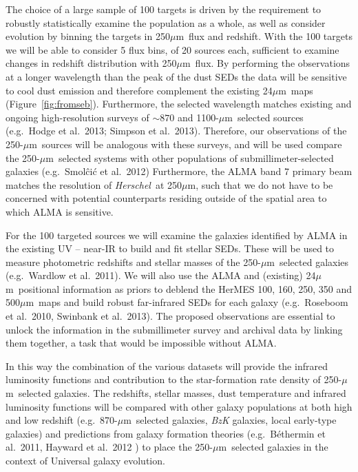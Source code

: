\documentclass[11pt,a4paper]{article}
\newcommand{\herschel}{{\it Herschel}}
\newcommand{\micron}{$\mu$m}
\begin{document}
The choice of a large sample of 100 targets is driven by the
requirement to robustly statistically examine the population as a
whole, as well as consider evolution by binning the targets in
250\micron\ flux and redshift. With the  100 targets we
will be able to consider 5 flux bins, of 20 sources each, sufficient
to examine changes in redshift distribution with 250\micron\ flux.
%
By performing the observations at a longer wavelength
than the peak of the dust SEDs the data will be sensitive to cool dust
emission and therefore complement the existing 24\micron\ maps
(Figure~\ref{fig:fromseb}). Furthermore, the selected wavelength
matches existing and ongoing high-resolution surveys of $\sim870$ and
1100-\micron\ selected sources (e.g.\ Hodge et al.\ 2013; Simpson et
al.\ 2013). Therefore, our observations of the 250-\micron\ sources
will be analogous with these surveys, and will be used compare the
250-\micron\ selected systems with other populations of
submillimeter-selected galaxies (e.g.\ Smol\^ci\'c et al.\ 2012)
Furthermore, the ALMA band 7 primary beam matches the resolution of
\herschel\ at 250\micron, such that we do not have to be concerned
with potential counterparts residing outside of the spatial area to
which ALMA is sensitive.

For the 100 targeted sources we will examine the galaxies
identified by ALMA in the existing UV -- near-IR to build and fit
stellar SEDs. These will be used to measure photometric redshifts and
stellar masses of the 250-\micron\ selected galaxies (e.g.\ Wardlow et
al.\ 2011). We will also use the ALMA and (existing) 24\micron\
positional information as priors to deblend the HerMES 100, 160, 250,
350 and 500\micron\ maps and build robust far-infrared SEDs for each
galaxy (e.g.\ Roseboom et al.\ 2010, Swinbank et al.\ 2013). The
proposed observations are essential to unlock the information in the
submillimeter survey and archival data by linking them together, a
task that would be impossible without ALMA.

In this way the combination of the various datasets will provide the infrared
luminosity functions and contribution to the star-formation rate
density of 250-\micron\ selected galaxies. The redshifts, stellar
masses, dust temperature and infrared luminosity functions will be
compared with other galaxy populations at both high and low redshift
(e.g.\ 870-\micron\ selected galaxies, {\it BzK} galaxies, local
early-type galaxies) and predictions from galaxy formation theories
(e.g.\ B\'ethermin et al.\ 2011, Hayward et al.\ 2012 ) to place the
250-\micron\ selected galaxies in the context of Universal galaxy
evolution.
\end{document}
